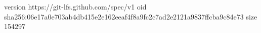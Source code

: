 version https://git-lfs.github.com/spec/v1
oid sha256:06e17a0e703ab4db415e2e162eeaf4f8a9fc2c7ad2e2121a9837ffcba9c84e73
size 154297
